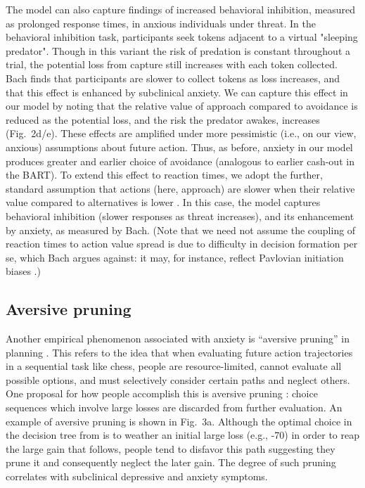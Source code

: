 \documentclass[11pt]{article} %
\begin{document}
The model can also capture findings of increased behavioral inhibition, measured as prolonged response times, in anxious individuals under threat\cite{bach2015}. In the behavioral inhibition task, participants seek tokens adjacent to a virtual "sleeping predator". Though in this variant the risk of predation is constant throughout a trial, the potential loss from capture still increases with each token collected. Bach \cite{bach2015} finds that participants are slower to collect tokens as loss increases, and that this effect is enhanced by subclinical anxiety. We can capture this effect in our model by noting that the relative value of approach compared to avoidance is reduced as the potential loss, and the risk the predator awakes, increases (Fig.~2d/e). These effects are amplified under more pessimistic (i.e., on our view, anxious) assumptions about future action. Thus, as before, anxiety in our model produces greater and earlier choice of avoidance (analogous to earlier cash-out in the BART). To extend this effect to reaction times, we adopt the further, standard assumption that actions (here, approach) are slower when their relative value compared to alternatives is lower \citep{oud2016}. In this case, the model captures behavioral inhibition (slower responses as threat increases), and its enhancement by anxiety, as measured by Bach. (Note that we need not assume the coupling of reaction times to action value spread is due to difficulty in decision formation per se, which Bach argues against: it may, for instance, reflect Pavlovian initiation biases \cite{niv2007}.)

\subsection{Aversive pruning} 

Another empirical phenomenon associated with anxiety is ``aversive pruning'' in planning \cite{Huys2012, Lally2017}. This refers to the idea that when evaluating future action trajectories in a sequential task like chess, people are resource-limited, cannot evaluate all possible options, and must selectively consider certain paths and neglect others. One proposal for how people accomplish this is aversive pruning \citep{Huys2012}: choice sequences which involve large losses are discarded from further evaluation. An example of aversive pruning is shown in Fig.~3a. Although the optimal choice in the decision tree from is to weather an initial large loss (e.g., -70) in order to reap the large gain that follows, people tend to disfavor this path suggesting they prune it and consequently neglect the later gain. The degree of such pruning correlates with subclinical depressive \cite{Huys2012} and anxiety \cite{Lally2017} symptoms. 
\end{document}
